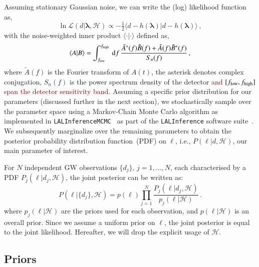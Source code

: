 \documentclass[twocolumn,
               prd,
               aps,
               superscriptaddress,
               tightenlines,
               nofootinbib,
               eqsecnum,
               amsfonts,
               amsmath,
               longbibliography]{revtex4-1}
\newcommand{\dd}{{\rm d}}
\newcommand{\ag}[1]{{\textcolor{Maroon}{{#1}} }}
\begin{document}
Assuming stationary Gaussian noise, we can write the (log) likelihood function as,
%
\begin{equation}
\ln \mathcal{L}(d \vert \bm{\lambda},\mathcal{H}) \propto
- \tfrac{1}{2}
\langle
d - h(\bm{\lambda}) \vert d - h(\bm{\lambda})
\rangle\,,
\end{equation}
%
with the noise-weighted inner product $\langle \cdot | \cdot \rangle$ defined as,
%
\begin{equation}
\langle A | B \rangle =
\int_{f_{\rm low}}^{f_{\rm high}} \, \dd f \,
\frac{\tilde{A}^{\ast}(f) \tilde{B}(f) + \tilde{A}(f) \tilde{B}^{\ast}(f)}{S_{n}(f)}\,,
\end{equation}
%
where $\tilde{A}(f)$ is the Fourier transform of $A(t)$, the asterisk denotes
complex conjugation, $S_{n}(f)$ is the power spectrum density of the
detector \ag{and $[f_{\rm low}, f_{\rm high}]$ span the detector sensitivity band.}
%
Assuming a specific prior distribution for our parameters (discussed further in the next section), we stochastically
sample over the parameter space using a Markov-Chain Monte Carlo algorithm as implemented in
\texttt{LALInferenceMCMC}~\cite{Rover:2006ni,vanderSluys:2008qx} as part of the \texttt{LALInference} software suite~\cite{Veitch:2014wba,lalsuite}.
%
We subsequently marginalize over the remaining parameters to obtain the
posterior probability distribution function~(PDF) on $\ell$,  i.e., $P(\ell \vert d,\mathcal{H})$,
our main parameter of interest.

For $N$ independent GW observations $\{d_j\}$, $j=1,...,N$, each characterised
by a PDF $P_j(\ell \vert d_j,\mathcal{H})$, the
joint posterior can be written as:
%
\begin{equation}
P(\ell | \{d_j\},\mathcal{H}) = p(\ell) \prod_{j=1}^{N} \frac{P_j(\ell | d_j,\mathcal{H})}{p_j(\ell|\mathcal{H})}\,.
\label{eq:cumulative_dist_ell}
\end{equation}
%
where $p_j(\ell | \mathcal{H})$ are the priors used for each observation, and $p(\ell | \mathcal{H})$ is an overall prior.
%
Since we assume a uniform prior on $\ell$, the joint posterior is 
equal to the joint likelihood. Hereafter, we will drop the explicit usage of
$\mathcal{H}$.
%
%


\subsection{Priors}
\end{document}
